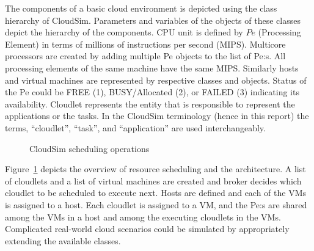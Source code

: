 \documentclass[times, 10pt,twocolumn]{article}
\begin{document}
The components of a basic cloud environment is depicted using the class hierarchy of CloudSim. Parameters and variables of the objects of these classes depict the hierarchy of the components. CPU unit is defined by $Pe$ (Processing Element) in terms of millions of instructions per second (MIPS). Multicore processors are created by adding multiple Pe objects to the list of Pe:s. All processing elements of the same machine have the same MIPS. Similarly hosts and virtual machines are represented by respective classes and objects. Status of the Pe could be FREE (1), BUSY/Allocated (2), or FAILED (3) indicating its availability. Cloudlet represents the entity that is responsible to represent the applications or the tasks. In the CloudSim terminology (hence in this report) the terms, ``cloudlet'', ``task'', and ``application'' are used interchangeably. 
\begin{figure}[ht]
 \caption{CloudSim scheduling operations}
 \label{fig:scheduling}
\end{figure}
Figure~\ref{fig:scheduling} depicts the overview of resource scheduling and the architecture. A list of cloudlets and a list of virtual machines are created and broker decides which cloudlet to be scheduled to execute next. Hosts are defined and each of the VMs is assigned to a host. Each cloudlet is assigned to a VM, and the Pe:s are shared among the VMs in a host and among the executing cloudlets in the VMs. Complicated real-world cloud scenarios could be simulated by appropriately extending the available classes.
\end{document}
